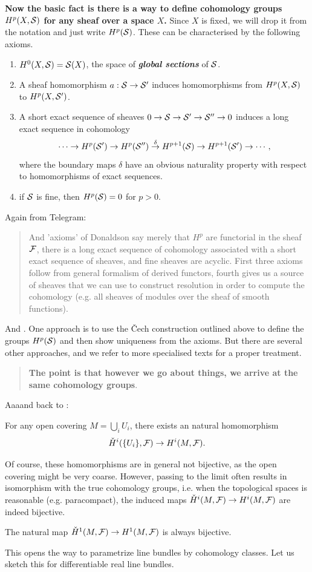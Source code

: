 \textbf{Now the basic fact is there is a way to define cohomology groups $H^p(X,\mathcal{S})$ for any sheaf over a space $X$.} Since $X$ is fixed, we will drop it from the notation and just write $H^p(\mathcal{S})$. These can be characterised by the following axioms.
\begin{enumerate}
	\item $H^0(X,\mathcal{S})=\mathcal{S}(X)$, the space of \textbf{\textit{global sections}} of $\mathcal{S}$.
	\item A sheaf homomorphism $a:\mathcal{S}\to\mathcal{S}'$ induces homomorphisms from $H^p(X,\mathcal{S})$ to $H^p(X,\mathcal{S}')$.
	\item A short exact sequence of sheaves $0\to\mathcal{S}\to\mathcal{S}'\to\mathcal{S}''\to0$ induces a long exact sequence in cohomology
	\[\cdots\to H^p(\mathcal{S}')\to H^p(\mathcal{S}'')\overset{\delta}{\to}H^{p+1}(\mathcal{S})\to H^{p+1}(\mathcal{S}')\to\cdots,\]
	where the boundary maps $\delta$ have an obvious naturality property with respect to homomorphisms of exact sequences.
	\item if $\mathcal{S}$ is fine, then $H^p(\mathcal{S})=0$ for $p>0$.
\end{enumerate}

Again from Telegram:
\begin{quote}
	And 'axioms' of Donaldson say merely that $H^p$ are functorial in the sheaf $\mathcal{F}$, there is a long exact sequence of cohomology associated with a short exact sequence of sheaves, and fine sheaves are acyclic. First three axioms follow from general formalism of derived functors, fourth gives us a source of sheaves that we can use to construct resolution in order to compute the cohomology (e.g. all sheaves of modules over the sheaf of smooth functions).
\end{quote}

And \cite{donaldson}. One approach is to use the \v Cech construction outlined above to define the groups $H^p(\mathcal{S})$ and then show uniqueness from the axioms. But there are several other approaches, and we refer to more specialised texts for a proper treatment.

\begin{quote}
	{\color{red}\textbf{The point is that however we go about things, we arrive at the same cohomology groups}.}
\end{quote}

Aaaand back to \cite{huybrechts}:
\begin{prop}
	For any open covering $M=\bigcup_iU_i$, there exists an natural homomorphism
	\[\check{H}^i(\{U_i\},\mathcal{F})\to H^i(M,\mathcal{F}).\]
\end{prop}
Of course, these homomorphisms are in general not bijective, as the open
covering might be very coarse. However, passing to the limit often results in isomorphism with the true cohomology groups, i.e. when the topological spaces is reasonable (e.g. paracompact), the induced maps $\check{H}^i(M,\mathcal{F})\to H^i(M,\mathcal{F})$ are indeed bijective.
\begin{prop}
	The natural map $\check{H}^1(M,\mathcal{F})\to H^1(M,\mathcal{F})$ is always bijective.
\end{prop}
This opens the way to parametrize line bundles by cohomology classes. Let us sketch this for differentiable real line bundles.

